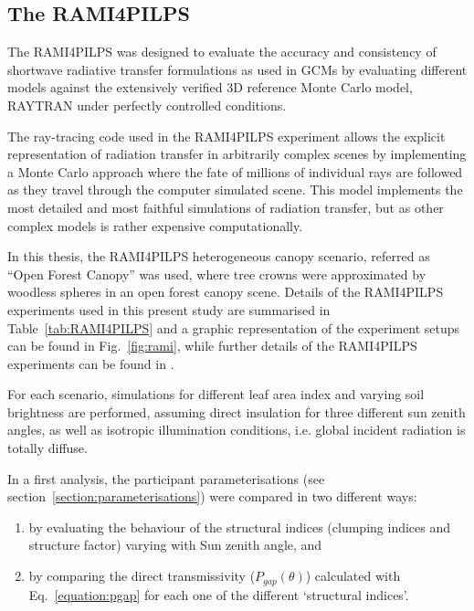 \documentclass[a4paper,11pt]{report}
\begin{document}
\subsection{The RAMI4PILPS}
The RAMI4PILPS \citep{Widlowski2011} was designed to evaluate the accuracy and consistency of shortwave radiative transfer formulations as used in GCMs by evaluating different models against the extensively verified 3D reference Monte Carlo model, RAYTRAN \citep{Govaerts1995} under perfectly controlled conditions. 

The ray-tracing code used in the RAMI4PILPS experiment allows the explicit representation of radiation transfer in arbitrarily complex scenes \citep{Govaerts1998} by implementing a Monte Carlo approach where the fate of millions of individual rays are followed as they travel through the computer simulated scene. This model implements the most detailed and most faithful simulations of radiation transfer, but as other complex models is rather expensive computationally. 

In this thesis, the RAMI4PILPS heterogeneous canopy scenario, referred as ``Open Forest Canopy'' was used, where tree crowns were approximated by woodless spheres in an open forest canopy scene. Details of the RAMI4PILPS experiments used in this present study are summarised in Table~\ref{tab:RAMI4PILPS} and a graphic representation of the experiment setups can be found in Fig.~\ref{fig:rami}, while further details of the RAMI4PILPS experiments can be found in \citet{Widlowski2011}. 

For each scenario, simulations for different leaf area index and varying soil brightness are performed, assuming direct insulation for three different sun zenith angles, as well as isotropic illumination conditions, i.e. global incident radiation is totally diffuse.

In a first analysis, the participant parameterisations (see section~\ref{section:parameterisations}) were compared in two different ways:
\begin{enumerate}[i]
\item by evaluating the behaviour of the structural indices (clumping indices and structure factor) varying with Sun zenith angle, and
\item by comparing the direct transmissivity ($P_{gap}(\theta)$) calculated with Eq.~\ref{equation:pgap} for each one of the different `structural indices'.
\end{enumerate}
\end{document}
